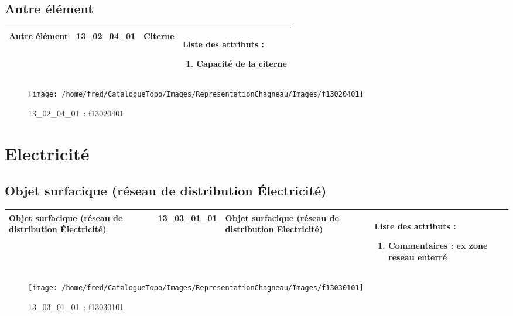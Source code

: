 \documentclass[12pt,titlepage]{book}
\begin{document}
\subsection{Autre élément}
\noindent
\vspace{\baselineskip}

\renewcommand{\arraystretch}{1.2}
\begin{supertabular}{|p{10cm}|c|p{13cm}|p{12cm}|}
 Autre élément & 13\_02\_04\_01 & Citerne & Liste des attributs :
\begin{enumerate}
  \item Capacité de la citerne\end{enumerate}
\\
\hline
\end{supertabular}
\begin{figure}[h!]
  \hfill         %
  \begin{minipage}[t]{3cm}
    \begin{center}
      \texttt{[image: /home/fred/CatalogueTopo/Images/RepresentationChagneau/Images/f13020401]}
      \caption[~13\_02\_04\_01]{\small{13\_02\_04\_01~:} \tiny{f13020401}}\label{f13020401}
    \end{center}
  \end{minipage}
\end{figure}

\section{\large Electricité}
\subsection{Objet surfacique (réseau de distribution Électricité)}
\noindent
\vspace{\baselineskip}

\renewcommand{\arraystretch}{1.2}
\begin{supertabular}{|p{10cm}|c|p{13cm}|p{12cm}|}
 Objet surfacique (réseau de distribution Électricité) & 13\_03\_01\_01 & Objet surfacique (réseau de distribution Electricité) & Liste des attributs :
\begin{enumerate}
  \item Commentaires : ex zone reseau enterré\end{enumerate}
\\
\hline
\end{supertabular}
\begin{figure}[h!]
  \hfill         %
  \begin{minipage}[t]{3cm}
    \begin{center}
      \texttt{[image: /home/fred/CatalogueTopo/Images/RepresentationChagneau/Images/f13030101]}
      \caption[~13\_03\_01\_01]{\small{13\_03\_01\_01~:} \tiny{f13030101}}\label{f13030101}
    \end{center}
  \end{minipage}
\end{figure}
\end{document}
